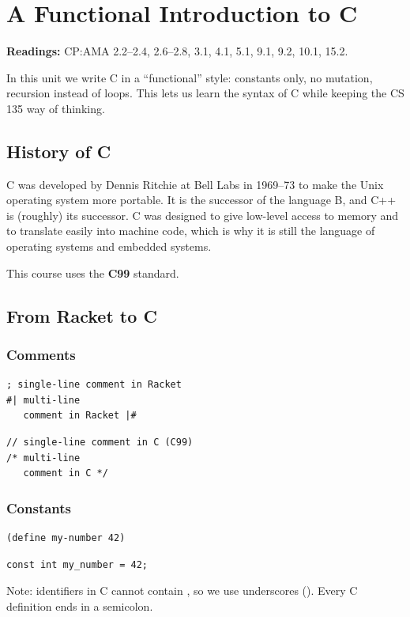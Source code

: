 \chapter{A Functional Introduction to C}

\textbf{Readings:} CP:AMA 2.2--2.4, 2.6--2.8, 3.1, 4.1, 5.1, 9.1, 9.2, 10.1, 15.2.

In this unit we write C in a ``functional'' style: constants only, no mutation, recursion
instead of loops. This lets us learn the syntax of C while keeping the CS 135 way of thinking.

\section{History of C}

C was developed by Dennis Ritchie at Bell Labs in 1969--73 to make the Unix operating system
more portable. It is the successor of the language B, and C++ is (roughly) its successor.
C was designed to give low-level access to memory and to translate easily into machine code,
which is why it is still the language of operating systems and embedded systems.

\begin{important}[Standard]
This course uses the \textbf{C99} standard.
\end{important}

\section{From Racket to C}

\subsection{Comments}
\begin{lstlisting}[style=racket]
; single-line comment in Racket
#| multi-line
   comment in Racket |#
\end{lstlisting}
\begin{lstlisting}[style=c]
// single-line comment in C (C99)
/* multi-line
   comment in C */
\end{lstlisting}

\subsection{Constants}
\begin{lstlisting}[style=racket]
(define my-number 42)
\end{lstlisting}
\begin{lstlisting}[style=c]
const int my_number = 42;
\end{lstlisting}
Note: identifiers in C cannot contain \code{-}, so we use underscores ().
Every C definition ends in a semicolon.

